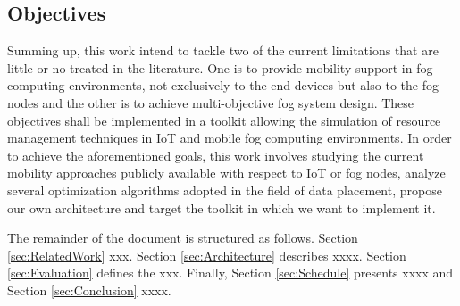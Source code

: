 \subsection{Objectives}\label{subsec:Objectives}
\noindent\tab Summing up, this work intend to tackle two of the current limitations that are little or no treated in the literature. One is to provide mobility support in fog computing environments, not exclusively to the end devices but also to the fog nodes and the other is to achieve multi-objective fog system design. These objectives shall be implemented in a toolkit allowing the simulation of resource management techniques in IoT and mobile fog computing environments. In order to achieve the aforementioned goals, this work involves studying the current mobility approaches publicly available with respect to IoT or fog nodes, analyze several optimization algorithms adopted in the field of data placement, propose our own architecture and target the toolkit in which we want to implement it.


\noindent\tab The remainder of the document is structured as follows. Section
\ref{sec:RelatedWork} xxx. Section \ref{sec:Architecture} describes xxxx.
Section \ref{sec:Evaluation} defines the xxx. Finally, Section
\ref{sec:Schedule} presents xxxx and Section \ref{sec:Conclusion} xxxx.